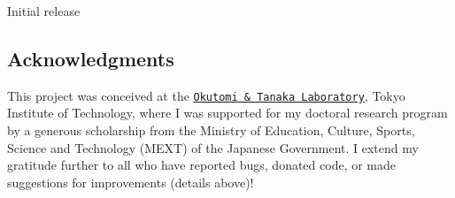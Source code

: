 Initial release

\subsection*{Acknowledgments }

This project was conceived at the \href{http://www.ok.ctrl.titech.ac.jp/}{\tt Okutomi \& Tanaka Laboratory}, Tokyo Institute of Technology, where I was supported for my doctoral research program by a generous scholarship from the Ministry of Education, Culture, Sports, Science and Technology (M\+E\+X\+T) of the Japanese Government. I extend my gratitude further to all who have reported bugs, donated code, or made suggestions for improvements (details above)! 